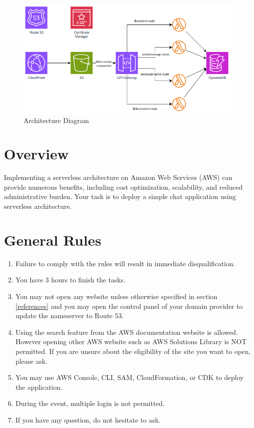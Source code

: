 \documentclass{article}
\begin{document}
\begin{figure}[h]
\centering
\includegraphics[width=\textwidth]{assets/architecture.png}
\caption{\label{fig:architecture}Architecture Diagram}
\end{figure}

\section{Overview}
Implementing a serverless architecture on Amazon Web Services (AWS) can provide numerous benefits, including cost optimization, scalability, and reduced administrative burden. Your task is to deploy a simple chat application using serverless architecture.

\section{General Rules}
\begin{enumerate}
    \item Failure to comply with the rules will result in immediate disqualification.
    \item You have 3 hours to finish the tasks.
    \item You may not open any website unless otherwise specified in section \ref{references} and you may open the control panel of your domain provider to update the nameserver to Route 53.
    \item Using the search feature from the AWS documentation website is allowed. However opening other AWS website such as AWS Solutions Library is NOT permitted. If you are unsure about the eligibility of the site you want to open, please ask.
    \item You may use AWS Console, CLI, SAM, CloudFormation, or CDK to deploy the application.
    \item During the event, multiple login is not permitted.
    \item If you have any question, do not hesitate to ask.
\end{enumerate}
\end{document}
